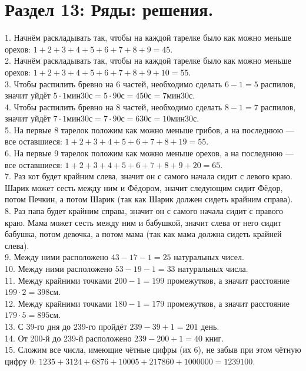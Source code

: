\section{Раздел 13: Ряды: решения.}
1. Начнём раскладывать так, чтобы на каждой тарелке было как можно меньше орехов: $1+2+3+4+5+6+7+8+9=45.$\\
2. Начнём раскладывать так, чтобы на каждой тарелке было как можно меньше орехов: $1+2+3+4+5+6+7+8+9+10=55.$\\
3. Чтобы распилить бревно на 6 частей, необходимо сделать $6-1=5$ распилов, значит уйдёт $5\cdot1\text{мин}30\text{с}=5\cdot90\text{с}=450\text{с}=7\text{мин}30\text{с}.$\\
4. Чтобы распилить бревно на 8 частей, необходимо сделать $8-1=7$ распилов, значит уйдёт $7\cdot1\text{мин}30\text{с}=7\cdot90\text{с}=630\text{с}=10\text{мин}30\text{с}.$\\
5. На первые 8 тарелок положим как можно меньше грибов, а на последнюю --- все оставшиеся: $1+2+3+4+5+6+7+8+19=55.$\\
6. На первые 9 тарелок положим как можно меньше орехов, а на последнюю --- все оставшиеся: $1+2+3+4+5+6+7+8+9+20=65.$\\
7. Раз кот будет крайним слева, значит он с самого начала сидит с левого краю. Шарик может сесть между ним и Фёдором, значит следующим сидит Фёдор, потом Печкин, а потом Шарик (так как Шарик должен сидеть крайним справа).\\
8. Раз папа будет крайним справа, значит он с самого начала сидит с правого краю. Мама может сесть между ним и бабушкой, значит слева от него сидит бабушка, потом девочка, а потом мама (так как мама должна сидеть крайней слева).\\
9. Между ними расположено $43-17-1=25$ натуральных чисел.\\
10. Между ними расположено $53-19-1=33$ натуральных числа.\\
11. Между крайними точками $200-1=199$ промежутков, а значит расстояние $199\cdot2=398$см.\\
12. Между крайними точками $180-1=179$ промежутков, а значит расстояние $179\cdot5=895$см.\\
13. С 39-го дня до 239-го пройдёт $239-39+1=201$ день.\\
14. От 200-й до 239-й расположено $239-200+1=40$ книг.\\
15. Сложим все числа, имеющие чётные цифры (их 6), не забыв при этом чётную цифру 0: $1235+3124+6876+10005+217860+1000000=1239100.$\\
